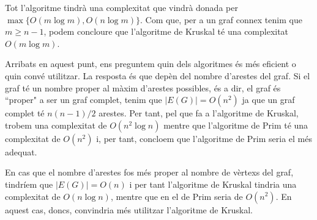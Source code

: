 \documentclass{article}
\begin{document}
Tot l’algoritme tindrà una complexitat que vindrà donada per $\max\{O(m\log m),O(n\log m)\}$. Com que, per a un graf connex tenim que $m\geq n-1$, podem concloure que l’algoritme de Kruskal té una complexitat $O(m\log m)$.\par
Arribats en aquest punt, ens preguntem quin dels algoritmes és més eficient o quin convé utilitzar. La resposta és que depèn del nombre d’arestes del graf. Si el graf té un nombre proper al màxim d'arestes possibles, és a dir, el graf és ``proper" a ser un graf complet, tenim que $|E(G)|= O(n^2)$ ja que un graf complet té $n(n-1)/2$ arestes. Per tant, pel que fa a l’algoritme de Kruskal, trobem una complexitat de $O(n^2\log n)$ mentre que l’algoritme de Prim té una complexitat de $O(n^2)$ i, per tant, concloem que l’algoritme de Prim seria el més adequat.\par
En cas que el nombre d’arestes fos més proper al nombre de vèrtexs del graf, tindríem que $|E(G)|=O(n)$ i per tant l’algoritme de Kruskal tindria una complexitat de $O(n\log n)$, mentre que en el de Prim seria de $O(n^2)$. En aquest cas, doncs, convindria més utilitzar l’algoritme de Kruskal. \cite{6}

\newpage
\printbibliography[heading=bibintoc,title={Referències}]
\end{document}
